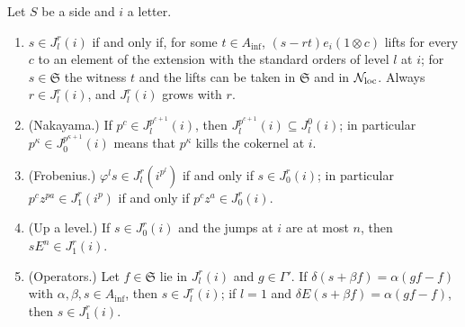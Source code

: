 \begin{lemma}\label{lem:lift-ideal}
Let $S$ be a side and $i$ a letter.
\begin{enumerate}[label=\textup{(\alph*)}]
\item $s\in J^r_l(i)$ if and only if, for some $t\in A_{\inf}$, $(s-rt)e_i(1\otimes c)$ lifts for every $c$ to an element of the extension with the standard orders of level $l$ at $i$; for $s\in\mathfrak S$ the witness $t$ and the lifts can be taken in $\mathfrak S$ and in $\mathcal N_{\rm loc}$. Always
$r\in J^r_l(i)$, and $J^r_l(i)$ grows with $r$.
\item (Nakayama.) If $p^c\in J^{p^{c+1}}_l(i)$, then $J^{p^{c+1}}_l(i)\subseteq J^0_l(i)$; in particular $p^\kappa\in J^{p^{\kappa+1}}_0(i)$ means that $p^\kappa$ kills the cokernel at $i$.
\item (Frobenius.) $\varphi^ls\in J^r_l(i^{p^l})$ if and only if $s\in J^r_0(i)$; in particular $p^cz^{pa}\in J^r_1(i^p)$ if and only if $p^cz^a\in J^r_0(i)$.
\item (Up a level.) If $s\in J^r_0(i)$ and the jumps at $i$ are at most $n$, then $sE^n\in J^r_1(i)$.
\item (Operators.) Let $f\in\mathfrak S$ lie in $J^r_l(i)$ and $g\in\Gamma'$. If $\delta(s+\beta f)=\alpha(gf-f)$ with $\alpha,\beta,s\in A_{\inf}$, then $s\in J^r_l(i)$; if $l=1$ and $\delta E(s+\beta f)=\alpha(gf-f)$, then $s\in J^r_1(i)$.
\end{enumerate}
\end{lemma}

